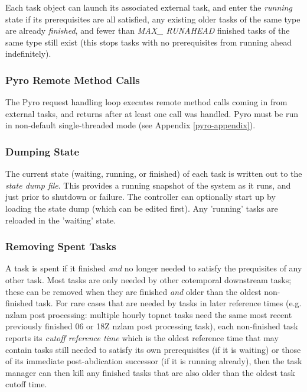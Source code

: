 \documentclass[11pt,a4paper]{article}
\begin{document}
Each task object can launch its associated external task, and enter the
{\em running} state if its prerequisites are all satisfied, any existing
older tasks of the same type are already {\em finished}, and fewer than
{\em MAX\_ RUNAHEAD} finished tasks of the same type still exist (this
stops tasks with no prerequisites from running ahead indefinitely).

\subsubsection{Pyro Remote Method Calls}

The Pyro request handling loop executes remote method calls coming in
from external tasks, and returns after at least one call was handled.
Pyro must be run in non-default single-threaded mode (see Appendix
\ref{pyro-appendix}).

\subsubsection{Dumping State} 

The current state (waiting, running, or finished) of each task is
written out to the {\em state dump file}.  This provides a running
snapshot of the system as it runs, and just prior to shutdown or
failure. The controller can optionally start up by loading the state
dump (which can be edited first). Any 'running' tasks are reloaded in
the 'waiting' state.

\subsubsection{Removing Spent Tasks} 

A task is spent if it finished {\em and} no longer needed to satisfy the
prequisites of any other task. Most tasks are only needed by other
cotemporal downstream tasks; these can be removed when they are finished
{\em and} older than the oldest non-finished task. For rare cases that
are needed by tasks in later reference times (e.g. nzlam post
processing: multiple hourly topnet tasks need the same most recent
previously finished 06 or 18Z nzlam post processing task), each
non-finished task reports its {\em cutoff reference time} which is the
oldest reference time that may contain tasks still needed to satisfy its
own prerequisites (if it is waiting) or those of its immediate
post-abdication successor (if it is running already), then the task
manager can then kill any finished tasks that are also older than the
oldest task cutoff time.
\end{document}

